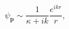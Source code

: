 \par\begin{equation}
 \psi_{\mathbf p}\sim\frac1{\kappa+ik}\frac{e^{ikr}}r,
 \tag{146.2}
\end{equation}
